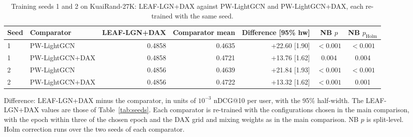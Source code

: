 \begin{table}[tbp]
\centering
\footnotesize
\caption{Training seeds 1 and 2 on KuaiRand-27K: LEAF-LGN+DAX against PW-LightGCN and PW-LightGCN+DAX, each re-trained with the same seed.}
\label{tab:seeds-pw}
\begin{adjustbox}{max width=\linewidth}
\begin{tabular}{llrrrcc}
\toprule
Seed & Comparator & LEAF-LGN+DAX & Comparator mean & Difference [95\% hw] & NB $p$ & NB $p_{\mathrm{Holm}}$ \\
\midrule
1 & PW-LightGCN & 0.4858 & 0.4635 & +22.60 [1.90] & $<0.001$ & $<0.001$ \\
1 & PW-LightGCN+DAX & 0.4858 & 0.4721 & +13.76 [1.62] & 0.004 & 0.004 \\
2 & PW-LightGCN & 0.4856 & 0.4639 & +21.84 [1.93] & $<0.001$ & $<0.001$ \\
2 & PW-LightGCN+DAX & 0.4856 & 0.4722 & +13.32 [1.62] & $<0.001$ & 0.001 \\
\bottomrule
\end{tabular}
\end{adjustbox}
\par\smallskip
\begin{minipage}{\linewidth}\raggedright\footnotesize Difference: LEAF-LGN+DAX minus the comparator, in units of $10^{-3}$ nDCG@10 per user, with the 95\% half-width. The LEAF-LGN+DAX values are those of Table~\ref{tab:seeds}. Each comparator is re-trained with the configurations chosen in the main comparison, with the epoch within three of the chosen epoch and the DAX grid and mixing weights as in the main comparison. NB $p$ is split-level. Holm correction runs over the two seeds of each comparator.\end{minipage}
\end{table}

